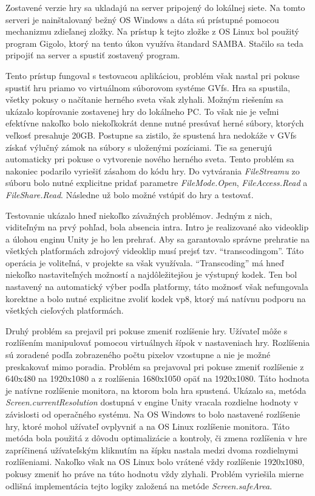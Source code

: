 \documentclass[slovak, bachelorpractice]{diploma}
\begin{document}
Zostavené verzie hry sa ukladajú na server pripojený do lokálnej siete. Na tomto serveri je nainštalovaný bežný OS Windows a dáta sú prístupné pomocou mechanizmu zdieľanej zložky. Na prístup k tejto zložke z OS Linux bol použitý program Gigolo, ktorý na tento úkon využíva štandard SAMBA. Stačilo sa teda pripojiť na server a spustiť zostavený program.

Tento prístup fungoval s testovacou aplikáciou, problém však nastal pri pokuse spustiť hru priamo vo virtuálnom súborovom systéme GVfs. Hra sa spustila, všetky pokusy o načítanie herného sveta však zlyhali. Možným riešením sa ukázalo kopírovanie zostavenej hry do lokálneho PC. To však nie je veľmi efektívne nakoľko bolo niekoľkokrát denne nutné presúvať herné súbory, ktorých veľkosť presahuje 20GB. Postupne sa zistilo, že spustená hra nedokáže v GVfs získať výlučný zámok na súbory s uloženými pozíciami. Tie sa generujú automaticky pri pokuse o vytvorenie nového herného sveta. Tento problém sa nakoniec podarilo vyriešiť zásahom do kódu hry. Do vytvárania \textit{FileStreamu} zo súboru bolo nutné explicitne pridať parametre \textit{FileMode.Open}, \textit{FileAccess.Read} a \textit{FileShare.Read}. Následne už bolo možné vstúpiť do hry a testovať.

Testovanie ukázalo hneď niekoľko závažných problémov. Jedným z nich, viditeľným na prvý pohľad, bola absencia intra. Intro je realizované ako videoklip a úlohou enginu Unity je ho len prehrať. Aby sa garantovalo správne prehratie na všetkých platformách zdrojový videoklip musí prejsť tzv. \enquote{transcodingom}. Táto operácia je voliteľná, v projekte sa však využívala. \enquote{Transcoding} má hneď niekoľko nastaviteľných možností a najdôležitejšou je výstupný kodek. Ten bol nastavený na automatický výber podľa platformy, táto možnosť však nefungovala korektne a bolo nutné explicitne zvoliť kodek vp8, ktorý má natívnu podporu na všetkých cieľových platformách.

Druhý problém sa prejavil pri pokuse zmeniť rozlíšenie hry. Užívateľ môže s rozlíšením manipulovať pomocou virtuálnych šípok v nastaveniach hry. Rozlíšenia sú zoradené podľa zobrazeného počtu pixelov vzostupne a nie je možné preskakovať mimo poradia. Problém sa prejavoval pri pokuse zmeniť rozlíšenie z 640x480 na 1920x1080 a z rozlíšenia 1680x1050 opäť na 1920x1080. Táto hodnota je natívne rozlíšenie monitora, na ktorom bola hra spustená. Ukázalo sa, metóda \textit{Screen.currentResolution} dostupná v engine Unity vracala rozdielne hodnoty v závislosti od operačného systému. Na OS Windows to bolo nastavené rozlíšenie hry, ktoré mohol užívateľ ovplyvniť a na OS Linux rozlíšenie monitora. Táto metóda bola použitá z dôvodu optimalizácie a kontroly, či zmena rozlíšenia v hre zapríčinená užívateľským kliknutím na šípku nastala medzi dvoma rozdielnymi rozlíšeniami. Nakoľko však na OS Linux bolo vrátené vždy rozlíšenie 1920x1080, pokusy zmeniť ho práve na túto hodnotu vždy zlyhali. Problém vyriešila mierne odlišná implementácia tejto logiky založená na metóde \textit{Screen.safeArea}.
\end{document}
